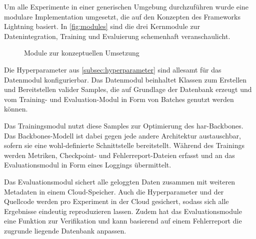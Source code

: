Um alle Experimente in einer generischen Umgebung durchzuführen wurde eine modulare Implementation umgesetzt, die auf den Konzepten des Frameworks Lightning \cite{Falcon19} basiert.
In \autoref{fig:modules} sind die drei Kernmodule zur Datenintegration, Training und Evaluierung schemenhaft veranschaulicht.

\begin{figure}
    \centering
    \caption{Module zur konzeptuellen Umsetzung}
    \label{fig:modules}
\end{figure}

Die Hyperparameter aus \autoref{subsec:hyperparameter} sind allesamt für das Datenmodul konfigurierbar.
Das Datenmodul beinhaltet Klassen zum Erstellen und Bereitstellen valider Samples, die auf Grundlage der Datenbank erzeugt und vom Training- und Evaluation-Modul in Form von Batches genutzt werden können.

Das Trainingsmodul nutzt diese Samples zur Optimierung des \gls{har}-Backbones.
Das Backbones-Modell ist dabei gegen jede andere Architektur austauschbar, sofern sie eine wohl-definierte Schnittstelle bereitstellt.
Während des Trainings werden Metriken, Checkpoint- und Fehlerreport-Dateien erfasst und an das Evaluationsmodul in Form eines Loggings übermittelt.

Das Evaluationsmodul sichert alle geloggten Daten zusammen mit weiteren Metadaten in einem Cloud-Speicher.
Auch die Hyperparameter und der Quellcode werden pro Experiment in der Cloud gesichert, sodass sich alle Ergebnisse eindeutig reproduzieren lassen.
Zudem hat das Evaluationsmodule eine Funktion zur Verifikation und kann basierend auf einem Fehlerreport die zugrunde liegende Datenbank anpassen.
